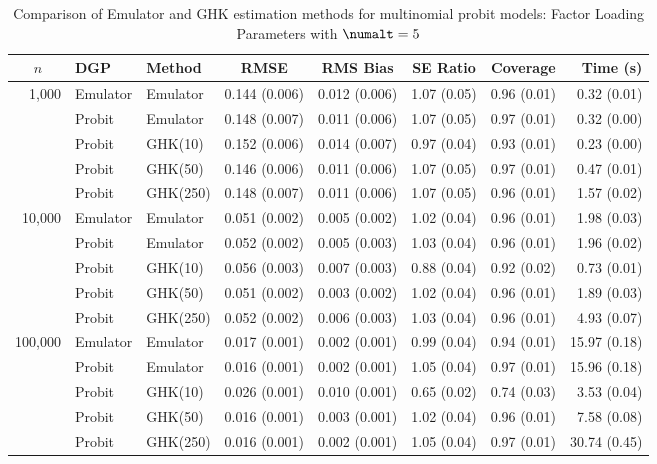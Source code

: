 \begin{table}[htbp]
\centering
\footnotesize
\begin{tabular}{@{}rllrrrrr@{}}
\toprule
\multicolumn{1}{c}{$n$} & \multicolumn{1}{l}{DGP} & \multicolumn{1}{l}{Method} & \multicolumn{1}{c}{RMSE} & \multicolumn{1}{c}{RMS Bias} & \multicolumn{1}{c}{SE Ratio} & \multicolumn{1}{c}{Coverage} & \multicolumn{1}{r}{Time (s)} \\
\midrule
\multirow{5}{*}{1,000} & Emulator & Emulator & 0.144 (0.006) & 0.012 (0.006) & 1.07 (0.05) & 0.96 (0.01) & 0.32 (0.01) \\
 & Probit & Emulator & 0.148 (0.007) & 0.011 (0.006) & 1.07 (0.05) & 0.97 (0.01) & 0.32 (0.00) \\
 & Probit & GHK(10) & 0.152 (0.006) & 0.014 (0.007) & 0.97 (0.04) & 0.93 (0.01) & 0.23 (0.00) \\
 & Probit & GHK(50) & 0.146 (0.006) & 0.011 (0.006) & 1.07 (0.05) & 0.97 (0.01) & 0.47 (0.01) \\
 & Probit & GHK(250) & 0.148 (0.007) & 0.011 (0.006) & 1.07 (0.05) & 0.96 (0.01) & 1.57 (0.02) \\
\midrule
\multirow{5}{*}{10,000} & Emulator & Emulator & 0.051 (0.002) & 0.005 (0.002) & 1.02 (0.04) & 0.96 (0.01) & 1.98 (0.03) \\
 & Probit & Emulator & 0.052 (0.002) & 0.005 (0.003) & 1.03 (0.04) & 0.96 (0.01) & 1.96 (0.02) \\
 & Probit & GHK(10) & 0.056 (0.003) & 0.007 (0.003) & 0.88 (0.04) & 0.92 (0.02) & 0.73 (0.01) \\
 & Probit & GHK(50) & 0.051 (0.002) & 0.003 (0.002) & 1.02 (0.04) & 0.96 (0.01) & 1.89 (0.03) \\
 & Probit & GHK(250) & 0.052 (0.002) & 0.006 (0.003) & 1.03 (0.04) & 0.96 (0.01) & 4.93 (0.07) \\
\midrule
\multirow{5}{*}{100,000} & Emulator & Emulator & 0.017 (0.001) & 0.002 (0.001) & 0.99 (0.04) & 0.94 (0.01) & 15.97 (0.18) \\
 & Probit & Emulator & 0.016 (0.001) & 0.002 (0.001) & 1.05 (0.04) & 0.97 (0.01) & 15.96 (0.18) \\
 & Probit & GHK(10) & 0.026 (0.001) & 0.010 (0.001) & 0.65 (0.02) & 0.74 (0.03) & 3.53 (0.04) \\
 & Probit & GHK(50) & 0.016 (0.001) & 0.003 (0.001) & 1.02 (0.04) & 0.96 (0.01) & 7.58 (0.08) \\
 & Probit & GHK(250) & 0.016 (0.001) & 0.002 (0.001) & 1.05 (0.04) & 0.97 (0.01) & 30.74 (0.45) \\
\bottomrule
\end{tabular}
\caption{Comparison of Emulator and GHK estimation methods for multinomial probit models: Factor Loading Parameters with $\numalt=5$}
\label{tab:emulator_vs_ghk:5:gamma}
\end{table}